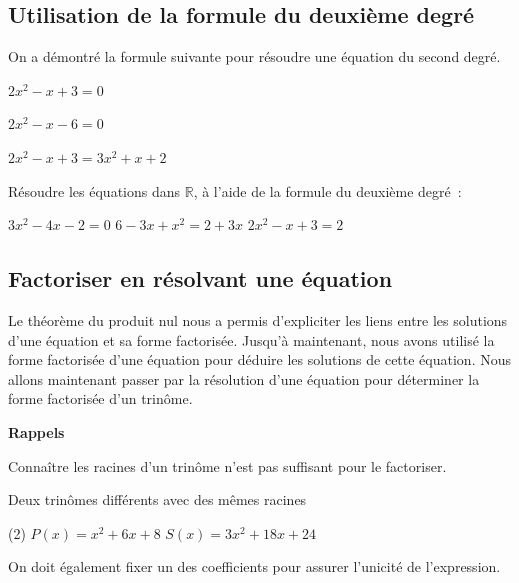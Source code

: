 \documentclass[a4paper,12pt]{article}
\begin{document}
\subsection{Utilisation de la formule du deuxième degré}
On a démontré la formule suivante pour résoudre une équation du second degré.

	\vspace{12cm}

\begin{exemple}
	$2x^2-x+3=0$
	\tcblower
	\vspace{10cm}
\end{exemple}
\begin{exemple}
	$2x^2-x-6=0$
	\tcblower
	\vspace{10cm}
\end{exemple}
\begin{exemple}
	$2x^2-x+3=3x^2+x+2$
	\tcblower
	\vspace{10cm}
\end{exemple}

\begin{exercice}
	\tcblower
Résoudre les équations dans $\mathbb{R}$, à l'aide de la formule du deuxième degré~:
\begin{tasks}
\task $3 x^2-4 x-2=0$
\task $6-3 x+x^2=2+3x$
\task $2 x^2-x+3=2$
\end{tasks}
\end{exercice}
\newpage
\subsection{Factoriser en résolvant une équation}
Le théorème du produit nul nous a permis d'expliciter les liens entre les solutions d'une équation et sa forme factorisée.
Jusqu'à maintenant, nous avons utilisé la forme factorisée d'une équation pour déduire les solutions de cette équation.
Nous allons maintenant passer par la résolution d'une équation pour déterminer la forme factorisée d'un trinôme. 

{\bfseries Rappels}
	\vspace{7cm}

Connaître les racines d'un trinôme n'est pas suffisant pour le factoriser.
\begin{exemple}
	Deux trinômes différents avec des mêmes racines
	\tcblower
	\begin{tasks}(2)
		\task[] $P(x)=x^2+6x+8$
		\task[] $S(x)=3x^2+18x+24$
	\end{tasks}
	\vspace{13cm}

\end{exemple}
\newpage
On doit également fixer un des coefficients pour assurer l'unicité de l'expression.
\end{document}
